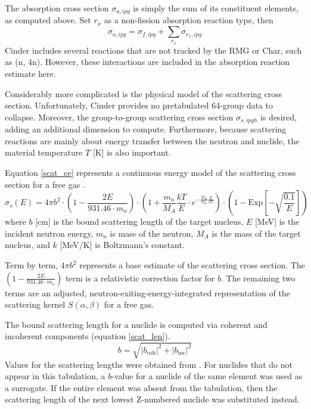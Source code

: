 The absorption cross section $\sigma_{a,ipg}$ is simply the sum of its constituent elements, as 
computed above.  Set $r_x$ as a non-fission absorption reaction type, then
\begin{equation}
\label{sig_a_model}
\sigma_{a,ipg} = \sigma_{f,ipg} + \sum_{r_x} \sigma_{r_x,ipg}
\end{equation}
Cinder includes several reactions that are not tracked by the RMG or Char, such as (n, 4n). 
However, these interactions are included in the absorption reaction estimate here.  

Considerably more complicated is the physical model of the scattering cross section.  Unfortunately, 
Cinder provides no pretabulated 64-group data to collapse.  Moreover, the group-to-group scattering
cross section $\sigma_{s,ipgh}$ is desired, adding an additional dimension to compute.
Furthermore, because scattering reactions are mainly about energy transfer between the neutron and 
nuclide, the material temperature $T$ [K] is also important.

Equation \ref{scat_ce} represents a continuous energy model of the scattering cross section for a free gas
\cite{Yamamoto2006, Mattes2005}.
\begin{equation}
\label{scat_ce}
\sigma_s(E) = 4 \pi b^2 \cdot \left(1 - \frac{2E}{931.46 \cdot m_n}\right) \cdot
              \left(1 + \frac{m_n}{M_A} \frac{kT}{E} \cdot e^{-\frac{M_A}{m_n}\frac{E}{kT}}\right) 
              \cdot \left(1 - \mbox{Exp}\left[-\sqrt{\frac{0.1}{E}}\right]\right)
\end{equation}
where $b$ [cm] is the bound scattering length of the target nucleus, $E$ [MeV] is the incident
neutron energy, $m_n$ is mass of the neutron, $M_A$ is the mass of the target nucleus, and
$k$ [MeV/K] is Boltzmann's constant.

Term by term, $4 \pi b^2$ represents a base estimate of the scattering cross section.  
The $\left(1 - \frac{2E}{931.46 \cdot m_n}\right)$ term is a relativistic correction
factor for $b$.  The remaining two terms are an adjusted, neutron-exiting-energy-integrated 
representation of the scattering kernel $S(\alpha, \beta)$ for a free gas.

The bound scattering length for a nuclide is computed via coherent and incoherent components
(equation \ref{scat_len}).
\begin{equation}
\label{scat_len}
b = \sqrt{\left| b_{\mbox{coh}} \right|^2 + \left| b_{\mbox{inc}} \right|^2}
\end{equation}
Values for the scattering lengths were obtained from \cite{Sears1992}.  For nuclides
that do not appear in this tabulation, a $b$-value for a nuclide of the same element was
used as a surrogate.  If the entire element was absent from the tabulation, then the 
scattering length of the next lowest Z-numbered nuclide was substituted instead.

